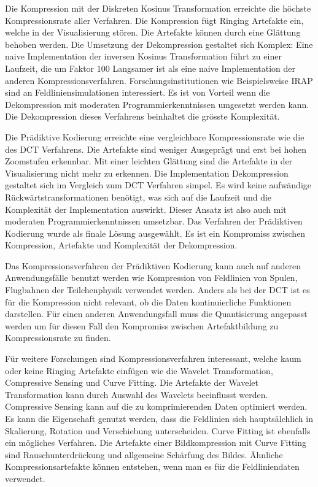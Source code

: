 Die Kompression mit der Diskreten Kosinus Transformation erreichte die höchste Kompressionsrate aller Verfahren. Die Kompression fügt Ringing Artefakte ein, welche in der Visualisierung stören. Die Artefakte können durch eine Glättung behoben werden. Die Umsetzung der Dekompression gestaltet sich Komplex: Eine naive Implementation der inversen Kosinus Transformation führt zu einer Laufzeit, die um Faktor $100$ Langsamer ist als eine naive Implementation der anderen Kompressionsverfahren. Forschungsinstitutionen wie Beispielsweise IRAP\cite{website:irap} sind an Feldliniensimulationen interessiert. Es ist von Vorteil wenn die Dekompression mit moderaten Programmierkenntnissen umgesetzt werden kann. Die Dekompression dieses Verfahrens beinhaltet die grösste Komplexität.

Die Prädiktive Kodierung erreichte eine vergleichbare Kompressionsrate wie die des DCT Verfahrens. Die Artefakte sind weniger Ausgeprägt und erst bei hohen Zoomstufen erkennbar. Mit einer leichten Glättung sind die Artefakte in der Visualisierung nicht mehr zu erkennen. Die Implementation Dekompression gestaltet sich im Vergleich zum DCT Verfahren simpel. Es wird keine aufwändige Rückwärtstransformationen benötigt, was sich auf die Laufzeit und die Komplexität der Implementation auswirkt. Dieser Ansatz ist also auch mit moderaten Programmierkenntnissen umsetzbar. Das Verfahren der Prädiktiven Kodierung wurde als finale Lösung ausgewählt. Es ist ein Kompromiss zwischen Kompression, Artefakte und Komplexität der Dekompression.

Das Kompressionsverfahren der Prädiktiven Kodierung kann auch auf anderen Anwendungsfälle benutzt werden wie Kompression von Feldlinien von Spulen, Flugbahnen der Teilchenphysik verwendet werden. Anders als bei der DCT ist es für die Kompression nicht relevant, ob die Daten kontinuierliche Funktionen darstellen. Für einen anderen Anwendungsfall muss die Quantisierung angepasst werden um für diesen Fall den Kompromiss zwischen Artefaktbildung zu Kompressionsrate zu finden.

Für weitere Forschungen sind Kompressionsverfahren interessant, welche kaum oder keine Ringing Artefakte einfügen wie die Wavelet Transformation, Compressive Sensing und Curve Fitting. Die Artefakte der Wavelet Transformation kann durch Auswahl des Wavelets beeinflusst werden. Compressive Sensing kann auf die zu komprimierenden Daten optimiert werden. Es kann die Eigenschaft genutzt werden, dass die Feldlinien sich hauptsälchlich in Skalierung, Rotation und Verschiebung unterscheiden. Curve Fitting ist ebenfalls ein mögliches Verfahren. Die Artefakte einer Bildkompression mit Curve Fitting sind Rauschunterdrückung und allgemeine Schärfung des Bildes. Ähnliche Kompressionsartefakte können entstehen, wenn man es für die Feldliniendaten verwendet.

